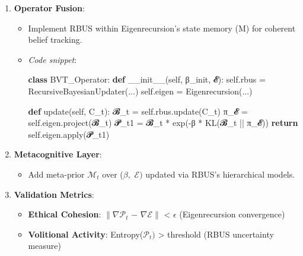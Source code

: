 \documentclass[
]{article}
\newenvironment{Shaded}{}{}
\newcommand{\BuiltInTok}[1]{\textcolor[rgb]{0.00,0.50,0.00}{#1}}
\newcommand{\ControlFlowTok}[1]{\textcolor[rgb]{0.00,0.44,0.13}{\textbf{#1}}}
\newcommand{\FunctionTok}[1]{\textcolor[rgb]{0.02,0.16,0.49}{#1}}
\newcommand{\KeywordTok}[1]{\textcolor[rgb]{0.00,0.44,0.13}{\textbf{#1}}}
\newcommand{\NormalTok}[1]{#1}
\newcommand{\OperatorTok}[1]{\textcolor[rgb]{0.40,0.40,0.40}{#1}}
\newcommand{\VariableTok}[1]{\textcolor[rgb]{0.10,0.09,0.49}{#1}}
\providecommand{\tightlist}{%
  \setlength{\itemsep}{0pt}\setlength{\parskip}{0pt}}
\begin{document}
\begin{enumerate}
\def\labelenumi{\arabic{enumi}.}
\tightlist
\item
  \textbf{Operator Fusion}:

  \begin{itemize}
  \item
    Implement RBUS within Eigenrecursion's state memory (M) for coherent
    belief tracking.\\
  \item
    \emph{Code snippet}:

\begin{Shaded}
\begin{Highlighting}[]
\KeywordTok{class}\NormalTok{ BVT\_Operator:  }
    \KeywordTok{def} \FunctionTok{\_\_init\_\_}\NormalTok{(}\VariableTok{self}\NormalTok{, β\_init, 𝓔):  }
        \VariableTok{self}\NormalTok{.rbus }\OperatorTok{=}\NormalTok{ RecursiveBayesianUpdater(...)  }
        \VariableTok{self}\NormalTok{.eigen }\OperatorTok{=}\NormalTok{ Eigenrecursion(...)  }

    \KeywordTok{def}\NormalTok{ update(}\VariableTok{self}\NormalTok{, C\_t):  }
\NormalTok{        𝓑\_t }\OperatorTok{=} \VariableTok{self}\NormalTok{.rbus.update(C\_t)  }
\NormalTok{        π\_𝓔 }\OperatorTok{=} \VariableTok{self}\NormalTok{.eigen.project(𝓑\_t)  }
\NormalTok{        𝓟\_t1 }\OperatorTok{=}\NormalTok{ 𝓑\_t }\OperatorTok{*}\NormalTok{ exp(}\OperatorTok{{-}}\NormalTok{β }\OperatorTok{*}\NormalTok{ KL(𝓑\_t }\OperatorTok{||}\NormalTok{ π\_𝓔))  }
        \ControlFlowTok{return} \VariableTok{self}\NormalTok{.eigen.}\BuiltInTok{apply}\NormalTok{(𝓟\_t1)  }
\end{Highlighting}
\end{Shaded}
  \end{itemize}
\item
  \textbf{Metacognitive Layer}:

  \begin{itemize}
  \tightlist
  \item
    Add meta-prior \(\mathcal{M}_{t}\) over (\(\beta ,\)
    \(\mathcal{E})\) updated via RBUS's hierarchical models.
  \end{itemize}
\item
  \textbf{Validation Metrics}:

  \begin{itemize}
  \tightlist
  \item
    \textbf{Ethical Cohesion}: \(\|\nabla \mathcal{P}_{t}\) \(-\)
    \(\nabla \mathcal{E}\|\) \textless{} \(\epsilon \) (Eigenrecursion
    convergence)\\
  \item
    \textbf{Volitional Activity}: Entropy(\(\mathcal{P}_{t})\)
    \textgreater{} threshold (RBUS uncertainty measure)
  \end{itemize}
\end{enumerate}
\end{document}
